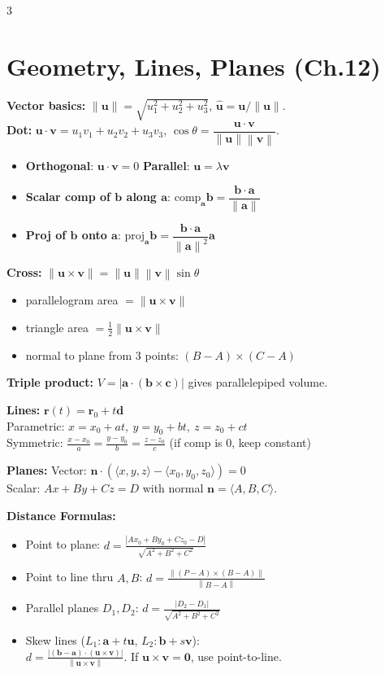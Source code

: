 \documentclass[12pt, landscape]{article}
\newcommand{\vct}[1]{\bm{#1}}
\newcommand{\uvct}[1]{\bm{\hat{#1}}}
\newcommand{\norm}[1]{\left\lVert#1\right\rVert}
\newcommand{\abs}[1]{\left\lvert#1\right\rvert}
\newcommand{\dotp}{\!\cdot\!}
\newcommand{\comp}[1]{\mathrm{comp}_{#1}}
\newcommand{\proj}[1]{\mathrm{proj}_{#1}}
\begin{document}
\begin{multicols}{3}
		\section{Geometry, Lines, Planes (Ch.12)}
		\textbf{Vector basics:} $\norm{\vct u}=\sqrt{u_1^2+u_2^2+u_3^2}$, $\uvct u=\vct u/\norm{\vct u}$.\\
		\textbf{Dot:} $\vct u\dotp\vct v=u_1v_1+u_2v_2+u_3v_3$, \quad $\cos\theta=\dfrac{\vct u\dotp\vct v}{\norm{\vct u}\norm{\vct v}}$.
		\begin{itemize}
			\item \textbf{Orthogonal}: $\vct u\dotp\vct v=0$ \quad \textbf{Parallel}: $\vct u=\lambda \vct v$
			\item \textbf{Scalar comp of $\vct b$ along $\vct a$}: $\comp{\vct a}\vct b=\dfrac{\vct b\dotp\vct a}{\norm{\vct a}}$
			\item \textbf{Proj of $\vct b$ onto $\vct a$}: $\proj{\vct a}\vct b=\dfrac{\vct b\dotp\vct a}{\norm{\vct a}^2}\vct a$
		\end{itemize}
		
		\textbf{Cross:} $\norm{\vct u\times\vct v}=\norm{\vct u}\norm{\vct v}\sin\theta$
		\begin{itemize}
			\item parallelogram area $=\norm{\vct u\times\vct v}$
			\item triangle area $=\frac12\norm{\vct u\times\vct v}$
			\item normal to plane from 3 points: $(B-A)\times(C-A)$
		\end{itemize}
		
		\textbf{Triple product:} $V=\abs{\vct a\dotp(\vct b\times\vct c)}$ gives parallelepiped volume.
		
		\textbf{Lines:} $\vct r(t)=\vct r_0+t\vct d$\\
		Parametric: $x=x_0+at,\ y=y_0+bt,\ z=z_0+ct$\\
		Symmetric: $\frac{x-x_0}{a}=\frac{y-y_0}{b}=\frac{z-z_0}{c}$ (if comp is 0, keep constant)
		
		\textbf{Planes:} Vector: $\vct n\dotp(\langle x,y,z\rangle-\langle x_0,y_0,z_0\rangle)=0$\\
		Scalar: $Ax+By+Cz=D$ with normal $\vct n=\langle A,B,C\rangle$.
		
		\textbf{Distance Formulas:}
		\begin{itemize}
			\item Point to plane: $d=\frac{\abs{Ax_0+By_0+Cz_0-D}}{\sqrt{A^2+B^2+C^2}}$
			\item Point to line thru $A,B$: $d=\frac{\norm{(P-A)\times(B-A)}}{\norm{B-A}}$
			\item Parallel planes $D_1,D_2$: $d=\frac{\abs{D_2-D_1}}{\sqrt{A^2+B^2+C^2}}$
			\item Skew lines ($L_1: \vct a+t\vct u$, $L_2: \vct b+s\vct v$):\\ $d=\frac{\abs{(\vct b-\vct a)\dotp(\vct u\times\vct v)}}{\norm{\vct u\times\vct v}}$. If $\vct u\times\vct v=\vct 0$, use point-to-line.
		\end{itemize}
		

\end{multicols}
\end{document}
